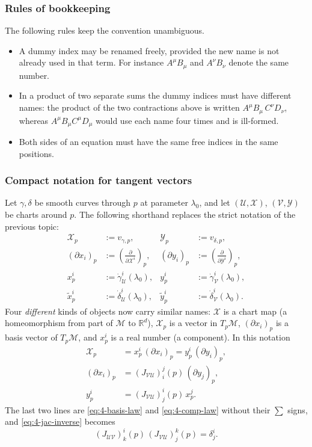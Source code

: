 \documentclass[11pt]{article}
\newcommand{\TpM}{T_p\mathcal M}
\begin{document}
\subsubsection*{Rules of bookkeeping}
The following rules keep the convention unambiguous.
\begin{itemize}
  \item A dummy index may be renamed freely, provided the new name is not already used in that term. For instance $A^\mu B_\mu$ and $A^\nu B_\nu$ denote the same number.
  \item In a product of two separate sums the dummy indices must have different names: the product of the two contractions above is written $A^\mu B_\mu\,C^\nu D_\nu$, whereas $A^\mu B_\mu C^\mu D_\mu$ would use each name four times and is ill-formed.
  \item Both sides of an equation must have the same free indices in the same positions.
\end{itemize}

\subsubsection*{Compact notation for tangent vectors}
Let $\gamma,\delta$ be smooth curves through $p$ at parameter $\lambda_0$, and let $(\mathcal U,\mathcal X)$, $(\mathcal V,\mathcal Y)$ be charts around $p$. The following shorthand replaces the strict notation of the previous topic:
\begin{align*}
\mathcal X_p&:=v_{\gamma,p}, & \mathcal Y_p&:=v_{\delta,p},\\
(\partial x_i)_p&:=\left(\frac{\partial}{\partial\mathcal X^i}\right)_p, & (\partial y_i)_p&:=\left(\frac{\partial}{\partial\mathcal Y^i}\right)_p,\\
x^i_p&:=\dot\gamma^i_{\mathcal U}(\lambda_0), & y^i_p&:=\dot\gamma^i_{\mathcal V}(\lambda_0),\\
\tilde x^i_p&:=\dot\delta^i_{\mathcal U}(\lambda_0), & \tilde y^i_p&:=\dot\delta^i_{\mathcal V}(\lambda_0).
\end{align*}
Four \emph{different} kinds of objects now carry similar names: $\mathcal X$ is a chart map (a homeomorphism from part of $\mathcal M$ to $\mathbb R^d$), $\mathcal X_p$ is a vector in $\TpM$, $(\partial x_i)_p$ is a basis vector of $\TpM$, and $x^i_p$ is a real number (a component). In this notation
\begin{align*}
\mathcal X_p&=x^i_p\,(\partial x_i)_p=y^i_p\,(\partial y_i)_p,\\
(\partial x_i)_p&=(J_{\mathcal{VU}})^j_i(p)\,(\partial y_j)_p,\\
y^i_p&=(J_{\mathcal{VU}})^i_j(p)\,x^j_p.
\end{align*}
The last two lines are \eqref{eq:4-basis-law} and \eqref{eq:4-comp-law} without their $\sum$ signs, and \eqref{eq:4-jac-inverse} becomes
\[
(J_{\mathcal{UV}})^i_k(p)\,(J_{\mathcal{VU}})^k_j(p)=\delta^i_j.
\]
\end{document}
